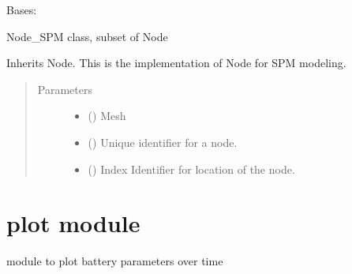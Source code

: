 \documentclass[letterpaper,10pt,english]{sphinxmanual}
\begin{document}
\begin{fulllineitems}
\label{\detokenize{node:node.Node_SPM}}
\sphinxAtStartPar
Bases: {\hyperref[\detokenize{node:node.Node}]{}}

\sphinxAtStartPar
Node\_SPM class, subset of Node

\sphinxAtStartPar
Inherits Node. This is the implementation of Node for SPM
modeling.
\begin{quote}\begin{description}
\item[{Parameters}] \leavevmode\begin{itemize}
\item {} 
\sphinxAtStartPar
{} (\sphinxstyleliteralemphasis{\sphinxupquote{{[}}}\sphinxstyleliteralemphasis{\sphinxupquote{{]}}}) \textendash{} Mesh

\item {} 
\sphinxAtStartPar
{} (\sphinxstyleliteralemphasis{\sphinxupquote{{[}}}\sphinxstyleliteralemphasis{\sphinxupquote{{]}}}) \textendash{} Unique identifier for a node.

\item {} 
\sphinxAtStartPar
{} (\sphinxstyleliteralemphasis{\sphinxupquote{{[}}}\sphinxstyleliteralemphasis{\sphinxupquote{{]}}}) \textendash{} Index Identifier for location of the node.

\end{itemize}

\end{description}\end{quote}

\end{fulllineitems}



\section{plot module}
\label{\detokenize{plot:module-plot}}\label{\detokenize{plot:plot-module}}\label{\detokenize{plot::doc}}
\sphinxAtStartPar
module to plot battery parameters over time
\end{document}

